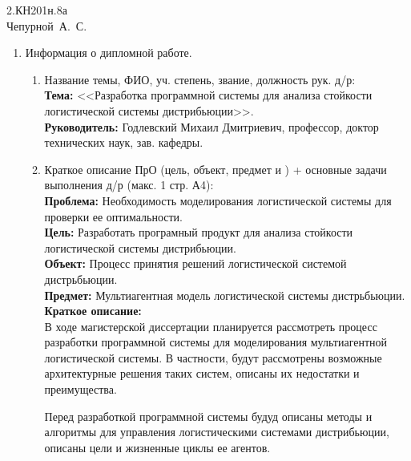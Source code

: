\documentclass[a4paper,14pt,oneside,final]{extarticle}
\begin{document}
\Russian

\begin{flushright}
2.КН201н.8а \\[0.4em]
{\large Чепурной~А.~С.} \\[0.8em]
\end{flushright}

\begin{enumerate}
    \item Информация о дипломной работе.
    \begin{enumerate}
        \item Название темы, ФИО, уч. степень, звание, должность рук. д/р: \\
        \textbf{Тема:} <<Разработка программной системы для анализа стойкости логистической системы дистрибьюции>>. \\
        \textbf{Руководитель:} Годлевский Михаил Дмитриевич, профессор, доктор технических наук, зав. кафедры.
        \item Краткое описание ПрО (цель, объект, предмет и ) + основные задачи выполнения д/р (макс. 1 стр. А4): \\
        \textbf{Проблема:} Необходимость моделирования логистической системы для проверки ее оптимальности. \\
        \textbf{Цель:}​ Разработать програмный продукт для анализа стойкости логистической системы дистрибьюции. \\
        \textbf{Объект:} ​Процесс принятия решений логистической системой дистрьбьюции. \\
        \textbf{Предмет:} ​Мультиагентная модель логистической системы дистрьбьюции. \\
        \textbf{Краткое описание:} \\
        В ходе магистерской диссертации планируется рассмотреть процесс разработки программной системы для моделирования мультиагентной логистической системы. 
        В частности, будут рассмотрены возможные архитектурные решения таких систем, описаны их недостатки и преимущества. 

        Перед разработкой программной системы будуд описаны методы и алгоритмы для управления логистическими системами дистрибьюции, описаны цели и жизненные циклы ее агентов.
        

\end{enumerate}
\end{enumerate}
\end{document}
